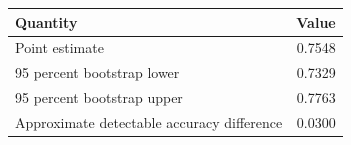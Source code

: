 \begin{tabular}{lr}
\toprule
Quantity & Value \\
\midrule
Point estimate & 0.7548 \\
95 percent bootstrap lower & 0.7329 \\
95 percent bootstrap upper & 0.7763 \\
Approximate detectable accuracy difference & 0.0300 \\
\bottomrule
\end{tabular}
